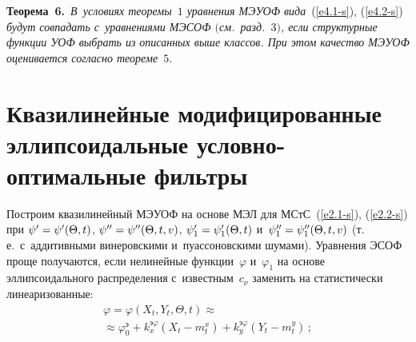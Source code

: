 \begin{multicols}{2}
\noindent
\textbf{Теорема~6.}\ \textit{В~условиях теоремы~$1$ 
уравнения \mbox{МЭУОФ} вида}~(\ref{e4.1-s}), (\ref{e4.2-s}) 
\textit{будут совпадать с~уравнениями \mbox{МЭСОФ} $($см.\ разд.~$3)$, если структурные функции УОФ 
выбрать из описанных выше классов. При этом качество МЭУОФ оценивается согласно 
тео\-ре\-ме~$5$}.

\section{Квазилинейные модифицированные эллипсоидальные условно-оптимальные фильтры}

Построим квазилинейный МЭУОФ на основе МЭЛ для МСтС~(\ref{e2.1-s}), 
(\ref{e2.2-s}) при $\psi'\hm=\psi'(\Theta,t)$, $\psi''\hm=\psi''(\Theta,t,v)$, 
$\psi_1'\hm=\psi_1'(\Theta,t)$ и~$\psi_1''\hm=\psi_1''(\Theta,t,v)$ (т.\,е.\
 с~аддитивными винеровскими и~пуассоновскими шумами). Уравнения ЭСОФ 
 проще получаются, если нелинейные функции~$\varphi$ и~$\varphi_1$ 
 на основе эл\-лип\-со\-и\-даль\-но\-го распределения с~известным~$c_\nu$ заменить 
 на статистически линеаризованные:
\begin{multline}
\varphi =\varphi \left( X_t, Y_t, \Theta, t\right) \approx {}\\
{}\approx
\varphi_0^{\mathrm{э}} + k_x^{\mathrm{э}\varphi} \left(X_t - m_t^x\right) +
k_y^{\mathrm{э}\varphi} \left(Y_t - m_t^y\right)\,;\label{e5.1-s}
\end{multline}

\vspace*{-12pt}


\end{multicols}

